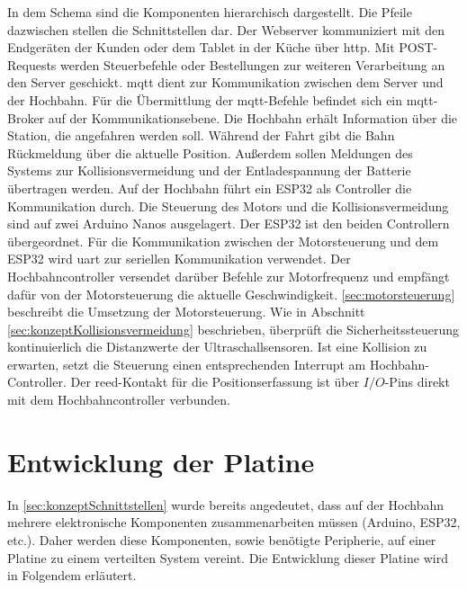In dem Schema sind die Komponenten hierarchisch dargestellt. Die Pfeile dazwischen stellen die Schnittstellen dar. Der Webserver kommuniziert mit den Endgeräten der Kunden oder dem Tablet in der Küche über \acrshort{http}. Mit POST-Requests werden Steuerbefehle oder Bestellungen zur weiteren Verarbeitung an den Server geschickt.
\acrshort{mqtt} dient zur Kommunikation zwischen dem Server und der Hochbahn. Für die Übermittlung der \acrshort{mqtt}-Befehle  befindet sich ein \acrshort{mqtt}-Broker auf der Kommunikationsebene. Die Hochbahn erhält Information über die Station, die angefahren werden soll. Während der Fahrt gibt die Bahn Rückmeldung über die aktuelle Position. Außerdem sollen Meldungen des Systems zur Kollisionsvermeidung und der Entladespannung der Batterie übertragen werden. Auf der Hochbahn führt ein ESP32 als Controller die Kommunikation durch. Die Steuerung des Motors und die Kollisionsvermeidung sind auf zwei Arduino Nanos ausgelagert. Der ESP32 ist den beiden Controllern übergeordnet. Für die Kommunikation zwischen der Motorsteuerung und dem ESP32 wird \acrshort{uart} zur seriellen Kommunikation verwendet. Der Hochbahncontroller versendet darüber Befehle zur Motorfrequenz und empfängt dafür von der Motorsteuerung die aktuelle Geschwindigkeit. \autoref{sec:motorsteuerung} beschreibt die Umsetzung der Motorsteuerung. Wie in Abschnitt \ref{sec:konzeptKollisionsvermeidung} beschrieben, überprüft die Sicherheitssteuerung kontinuierlich die Distanzwerte der Ultraschallsensoren. Ist eine Kollision zu erwarten, setzt die Steuerung einen entsprechenden Interrupt am Hochbahn-Controller. Der \acrshort{reed}-Kontakt für die Positionserfassung ist über $I/O$-Pins direkt mit dem Hochbahncontroller verbunden. 

\chapter{Entwicklung der Platine}
\label{sec:ecardConcept}
In \autoref{sec:konzeptSchnittstellen} wurde bereits angedeutet, dass auf der Hochbahn mehrere elektronische Komponenten zusammenarbeiten müssen (Arduino, ESP32, etc.). Daher werden diese Komponenten, sowie benötigte Peripherie, auf einer Platine zu einem verteilten System vereint. 
Die Entwicklung dieser Platine wird in Folgendem erläutert.

